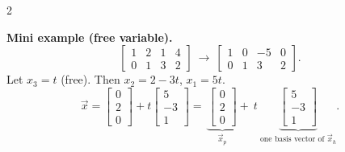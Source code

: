 \documentclass[8pt]{extarticle}
\begin{document}
\begin{multicols}{2}
\begin{tcolorbox}[title={How to Solve $A\vec{x}=\vec{b}$ (Step-by-step)}, colframe=black!60!white, colback=gray!2]
\textbf{Mini example (free variable).}
\[
\left[
\begin{array}{ccc|c}
1&2&1&4\\
0&1&3&2
\end{array}
\right]
\ \longrightarrow\ 
\left[
\begin{array}{ccc|c}
1&0&-5&0\\
0&1&3&2
\end{array}
\right].
\]
Let $x_3=t$ (free). Then $x_2=2-3t$, $x_1=5t$.
\[
\vec{x}=\begin{bmatrix}0\\2\\0\end{bmatrix}
+t\begin{bmatrix}5\\-3\\1\end{bmatrix}
=\ \underbrace{\begin{bmatrix}0\\2\\0\end{bmatrix}}_{\vec{x}_p}
+\ t\ \underbrace{\begin{bmatrix}5\\-3\\1\end{bmatrix}}_{\text{one basis vector of }\vec{x}_h}.
\]


\end{tcolorbox}
\end{multicols}
\end{document}
